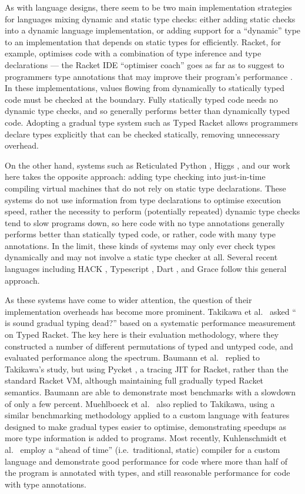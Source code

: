 As with language designs, there seem to be two main implementation
strategies for languages mixing dynamic and static type checks: either
adding static checks into a dynamic language implementation, or adding
support for a ``dynamic'' type to an implementation that depends on
static types for efficiently. Racket, for example, optimises code with
a combination of type inference and type declarations --- the Racket
IDE ``optimiser coach'' goes as far as to suggest to programmers type
annotations that may improve their program's performance
\cite{ShriramOptimiserCoach}. In these implementations, values flowing
from dynamically to statically typed code must be checked at the
boundary.  Fully statically typed code needs no dynamic type checks,
and so generally performs better than dynamically typed code. Adopting
a gradual type system such as Typed Racket \cite{TypedRacket} allows
programmers declare types explicitly that can be checked statically,
removing unnecessary overhead.

On the other hand, systems such as Reticulated Python
\cite{ReticulatedPython}, Higgs \cite{VM-aready-knew-that}, and our
work here takes the opposite approach: adding type checking into
just-in-time compiling virtual machines that do not rely on static
type declarations. These systems do not use information from type
declarations to optimise execution speed, rather the necessity to
perform (potentially repeated) dynamic type checks tend to slow
programs down, so here code with no type annotations generally
performs better than statically typed code, or rather, code with many
type annotations. In the limit, these kinds of systems may only ever
check types dynamically and may not involve a static type checker at
all.  Several recent languages including HACK \cite{HACK}, Typescript
\cite{typescript}, Dart \cite{dart}, and Grace \cite{grace} follow
this general approach.

As these systems have come to wider attention, the question of their
implementation overheads has become more prominent.  
Takikawa et al.\ \cite{Takikawa2016} asked `` is sound gradual typing
dead?'' based on a systematic performance measurement on Typed Racket.
The key here is their evaluation methodology, where they constructed a
number of different permutations of typed and untyped code, and
evaluated performance along the spectrum.
Baumann et al.\ \cite{Bauman2017} replied to Takikawa's study, but
using Pycket \cite{Pycketshortpaper}, a tracing JIT for Racket, rather
than the standard Racket VM, although maintaining full gradually typed
Racket semantics. Baumann are able to demonstrate most benchmarks
with a slowdown of only a few percent.
Muehlboeck et al.\ \cite{Muehlboeck2017} also replied to Takikawa, 
using a similar benchmarking methodology applied to a custom language
with features designed to make gradual types easier to optimise, 
demonstrating speedups as more type information is added to programs. 
Most recently, Kuhlenschmidt et al.\ \cite{Kuhlenschmidt2018} employ a
``ahead of time'' (i.e.\ traditional, static) compiler for a custom
language and demonstrate good performance for code where more than
half of the program is annotated with types, and still reasonable
performance for code with type annotations. 

